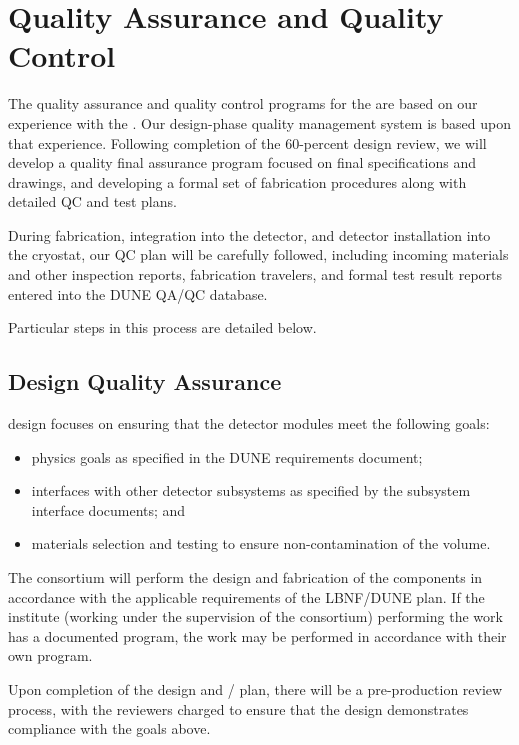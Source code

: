 \section{Quality Assurance and Quality Control}
\label{sec:fdsp-pd-qaqc}

The quality assurance and quality control programs for the  are based on our experience with the .  Our design-phase quality management system is based upon that experience.  Following completion of the 60-percent design review, we will develop a quality final assurance program focused on final specifications and drawings, and developing a formal set of fabrication procedures along with detailed QC and test plans.

During fabrication, integration into the detector, and detector installation into the cryostat, our QC plan will be carefully followed, including incoming materials and other inspection reports, fabrication travelers, and formal test result reports entered into the DUNE QA/QC database.

Particular steps in this process are detailed below.

\subsection{Design Quality Assurance}
\label{sec:fdsp-pd-designqa}

 design  focuses on ensuring that the detector modules meet the following goals:
\begin{itemize}
\item physics goals as specified in the DUNE requirements document;
\item interfaces with other detector subsystems as specified by the subsystem interface documents; and
\item materials selection and testing to ensure non-contamination of the \lar volume.
\end{itemize}

The  consortium will perform the design and fabrication of the components in accordance with the applicable requirements of the LBNF/DUNE  plan. If the institute (working under the supervision of the consortium) performing the work has a documented  program, the work may be performed in accordance with their own program.

Upon completion of the  design and / plan, there will be a pre-production review process, with the reviewers charged to ensure that the design demonstrates compliance with the goals above.

